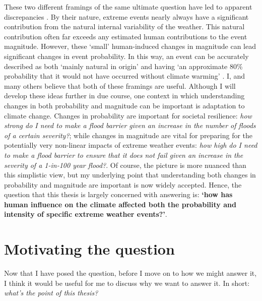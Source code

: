   These two different framings of the same ultimate question have led to apparent discrepancies \citep{otto_reconciling_2012}. By their nature, extreme events nearly always have a significant contribution from the natural internal variability of the weather. This natural contribution often far exceeds any estimated human contributions to the event magnitude. However, these `small' human-induced changes in magnitude can lead significant changes in event probability. In this way, an event can be accurately described as both `mainly natural in origin' \citep{dole_was_2011} and having `an approximate 80\% probability that it would not have occurred without climate warming' \citep{rahmstorf_increase_2011}. I, and many others \citep{stott_attribution_2013,stott_attribution_2016,otto_attribution_2016,swain_attributing_2020,easterling_detection_2016,national_academies_of_sciences_engineering_and_medicine_attribution_2016} believe that both of these framings are useful. Although I will develop these ideas further in due course, one context in which understanding changes in both probability and magnitude can be important is adaptation to climate change. Changes in probability are important for societal resilience: \emph{how strong do I need to make a flood barrier given an increase in the number of floods of a certain severity?}; while changes in magnitude are vital for preparing for the potentially very non-linear impacts of extreme weather events: \emph{how high do I need to make a flood barrier to ensure that it does not fail given an increase in the severity of a 1-in-100 year flood?}. Of course, the picture is more nuanced than this simplistic view, but my underlying point that understanding both changes in probability and magnitude are important is now widely accepted. Hence, the question that this thesis is largely concerned with answering is: \textbf{`how has human influence on the climate affected both the probability and intensity of specific extreme weather events?'}.


\section{Motivating the question}\label{intro:motivation}

  Now that I have posed the question, before I move on to how we might answer it, I think it would be useful for me to discuss why we want to answer it. In short: \emph{what's the point of this thesis?}

